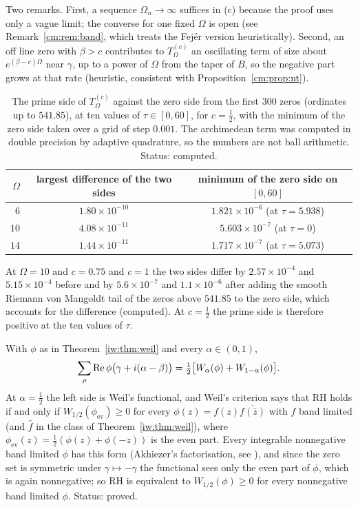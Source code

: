 Two remarks. First, a sequence $\Omega_n\to\infty$ suffices in (c) because the proof uses only a vague limit; the converse for one fixed $\Omega$ is open (see Remark~\ref{cm:rem:band}, which treats the Fej\'er version heuristically). Second, an off line zero with $\beta>c$ contributes to $T^{(c)}_\Omega$ an oscillating term of size about $e^{(\beta-c)\Omega}$ near $\gamma$, up to a power of $\Omega$ from the taper of $B$, so the negative part grows at that rate (heuristic, consistent with Proposition~\ref{cm:prop:nt}).
\begin{table}[ht]
\centering
\caption{The prime side of $T^{(c)}_\Omega$ against the zero side from the first $300$ zeros (ordinates up to $541.85$), at ten values of $\tau\in[0,60]$, for $c=\tfrac12$, with the minimum of the zero side taken over a grid of step $0.001$. The archimedean term was computed in double precision by adaptive quadrature, so the numbers are not ball arithmetic. Status: computed.}\label{iw:tab:jackson}
\begin{tabular}{rcc}
\toprule
$\Omega$ & largest difference of the two sides & minimum of the zero side on $[0,60]$\\
\midrule
$6$ & $1.80\times10^{-10}$ & $1.821\times10^{-6}$ (at $\tau=5.938$)\\
$10$ & $4.08\times10^{-11}$ & $5.603\times10^{-7}$ (at $\tau=0$)\\
$14$ & $1.44\times10^{-11}$ & $1.717\times10^{-7}$ (at $\tau=5.073$)\\
\bottomrule
\end{tabular}
\end{table}

At $\Omega=10$ and $c=0.75$ and $c=1$ the two sides differ by $2.57\times10^{-4}$ and $5.15\times10^{-4}$ before and by $5.6\times10^{-7}$ and $1.1\times10^{-6}$ after adding the smooth Riemann von Mangoldt tail of the zeros above $541.85$ to the zero side, which accounts for the difference (computed). At $c=\tfrac12$ the prime side is therefore positive at the ten values of $\tau$.

\begin{proposition}\label{iw:prop:weilavg}
With $\phi$ as in Theorem~\ref{iw:thm:weil} and every $\alpha\in(0,1)$,
\[
\sum_\rho\operatorname{Re}\phi\big(\gamma+i(\alpha-\beta)\big)=\tfrac12\big[W_\alpha(\phi)+W_{1-\alpha}(\phi)\big].
\]
At $\alpha=\frac12$ the left side is Weil's functional, and Weil's criterion \cite{Weil52,Bombieri} says that RH holds if and only if $W_{1/2}(\phi_{\mathrm{ev}})\ge0$ for every $\phi(z)=f(z)\overline{f(\bar z)}$ with $f$ band limited (and $\widehat f$ in the class of Theorem~\ref{iw:thm:weil}), where $\phi_{\mathrm{ev}}(z)=\frac12(\phi(z)+\phi(-z))$ is the even part. Every integrable nonnegative band limited $\phi$ has this form (Akhiezer's factorisation, see \cite{NCBoas54}), and since the zero set is symmetric under $\gamma\mapsto-\gamma$ the functional sees only the even part of $\phi$, which is again nonnegative; so RH is equivalent to $W_{1/2}(\phi)\ge0$ for every nonnegative band limited $\phi$. Status: proved.
\end{proposition}


